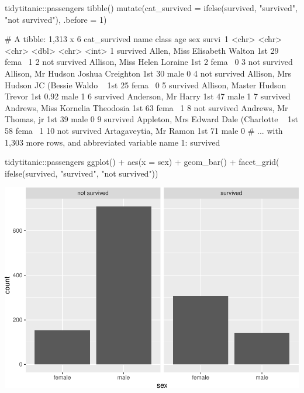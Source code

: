 \begin{Schunk}
\begin{Sinput}
tidytitanic::passengers %
  tibble() %
  mutate(cat_survived = ifelse(survived, "survived", "not survived"), 
         .before = 1)
\end{Sinput}
\begin{Soutput}
     # A tibble: 1,313 x 6
        cat_survived name                                   class   age sex   survi~1
        <chr>        <chr>                                  <chr> <dbl> <chr>   <int>
      1 survived     Allen, Miss Elisabeth Walton           1st   29    fema~       1
      2 not survived Allison, Miss Helen Loraine            1st    2    fema~       0
      3 not survived Allison, Mr Hudson Joshua Creighton    1st   30    male        0
      4 not survived Allison, Mrs Hudson JC (Bessie Waldo ~ 1st   25    fema~       0
      5 survived     Allison, Master Hudson Trevor          1st    0.92 male        1
      6 survived     Anderson, Mr Harry                     1st   47    male        1
      7 survived     Andrews, Miss Kornelia Theodosia       1st   63    fema~       1
      8 not survived Andrews, Mr Thomas, jr                 1st   39    male        0
      9 survived     Appleton, Mrs Edward Dale (Charlotte ~ 1st   58    fema~       1
     10 not survived Artagaveytia, Mr Ramon                 1st   71    male        0
     # ... with 1,303 more rows, and abbreviated variable name 1: survived
\end{Soutput}
\begin{Sinput}
tidytitanic::passengers %
ggplot() + 
  aes(x = sex) + 
  geom_bar() + 
  facet_grid(~ ifelse(survived, "survived", "not survived")) 
\end{Sinput}

\includegraphics[width=0.69\linewidth]{r_journal_files/figure-latex/unnamed-chunk-4-1} \end{Schunk}

